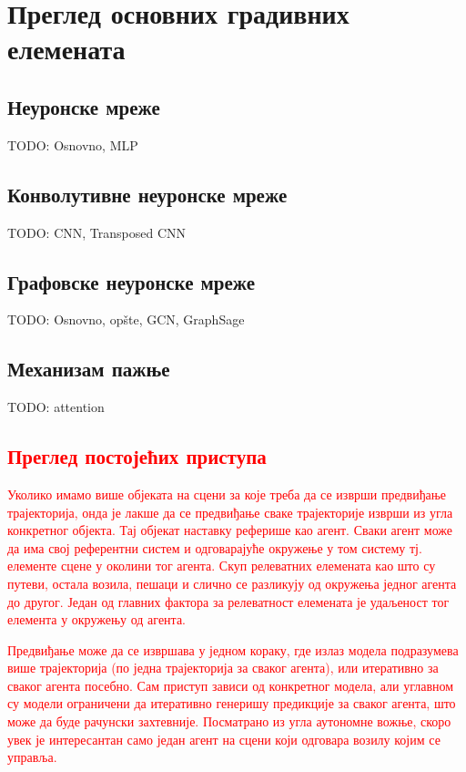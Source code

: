 \documentclass[11pt,oneside]{memoir}
\begin{document}
\chapter{Преглед основних градивних елемената}
\label{chp:razrada}

\section{Неуронске мреже}

TODO: Osnovno, MLP

\section{Конволутивне неуронске мреже}

TODO: CNN, Transposed CNN

\section{Графовске неуронске мреже}

TODO: Osnovno, opšte, GCN, GraphSage

\section{Механизам пажње}

TODO: attention

\textcolor{red}{\chapter{Преглед постојећих приступа}}
\label{chp:razrada}

\textcolor{red}{Уколико имамо више објеката на сцени за које треба да се изврши предвиђање трајекторија, онда је лакше да се предвиђање сваке 
трајекторије изврши из угла конкретног објекта. Тај објекат наставку реферише као агент. Сваки агент може да има свој референтни систем
и одговарајуће окружење у том систему тј. елементе сцене у околини тог агента. Скуп релеватних елемената као што су путеви, остала возила, пешаци и слично се
разликују од окружења једног агента до другог. Један од главних фактора за релеватност елемената је удаљеност тог елемента у окружењу од агента.}

\textcolor{red}{Предвиђање може да се извршава у једном кораку, где излаз модела подразумева више трајекторија (по једна трајекторија за сваког агента), 
или итеративно за сваког агента посебно. Сам приступ зависи од конкретног модела, 
али углавном су модели ограничени да итеративно генеришу предикције за сваког агента, што може да буде рачунски захтевније. 
Посматрано из угла аутономне вожње, скоро увек је интересантан само један агент на сцени који одговара возилу којим се управља.}
\end{document}
